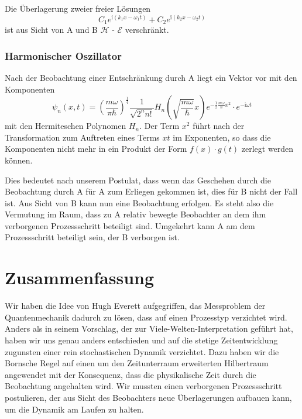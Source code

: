 \documentclass[12pt]{article}
\begin{document}
Die Überlagerung zweier freier Lösungen
\begin{equation*}
C_1 e^{\mathrm{i}(k_1 x-\omega_1 t)} + C_2 e^{\mathrm{i}(k_2 x-\omega_2 t)}
\end{equation*}
ist aus Sicht von A und B $\mathscr{H}$ - $\mathscr{E}$  verschränkt.

\subsubsection{Harmonischer Oszillator}

Nach der Beobachtung einer Entschränkung durch A liegt ein Vektor vor mit den Komponenten 
\begin{equation*}
\psi _{n}(x,t)=\left({\frac {m\omega }{\pi \hbar }}\right)^{\frac {1}{4}}{\frac {1}{\sqrt {2^{n}n!}}}H_{n}\left({\sqrt {\frac {m\omega }{\hbar }}}x\right)e^{-{\frac {1}{2}}{\frac {m\omega }{\hbar }}x^{2}} \cdot e^{-\mathrm{i}\omega t}
\end{equation*}
mit den Hermiteschen Polynomen $H_n$. Der Term $x^2$ führt nach der Transformation zum Auftreten eines Terms $xt$ im Exponenten, so dass die Komponenten nicht mehr in ein Produkt der Form $f(x) \cdot g(t)$ zerlegt werden können.

Dies bedeutet nach unserem Postulat, dass wenn das Geschehen durch die Beobachtung durch A für A zum Erliegen gekommen ist, dies für B nicht der Fall ist. Aus Sicht von B kann nun eine Beobachtung erfolgen. Es steht also die Vermutung im Raum, dass zu A relativ bewegte Beobachter an dem ihm verborgenen Prozessschritt beteiligt sind. Umgekehrt kann A am dem Prozessschritt beteiligt sein, der B verborgen ist.

\section{Zusammenfassung}
Wir haben die Idee von Hugh Everett aufgegriffen, das Messproblem der Quantenmechanik dadurch zu lösen, dass auf einen Prozesstyp verzichtet wird. Anders als in seinem Vorschlag, der zur Viele-Welten-Interpretation geführt hat, haben wir uns genau anders entschieden und auf die stetige Zeitentwicklung zugunsten einer rein stochastischen Dynamik verzichtet. Dazu haben wir die Bornsche Regel auf einen um den Zeitunterraum erweiterten Hilbertraum angewendet mit der Konsequenz, dass die physikalische Zeit durch die Beobachtung angehalten wird. Wir mussten einen verborgenen Prozessschritt postulieren, der aus Sicht des Beobachters neue Überlagerungen aufbauen kann, um die Dynamik am Laufen zu halten. 
\end{document}
